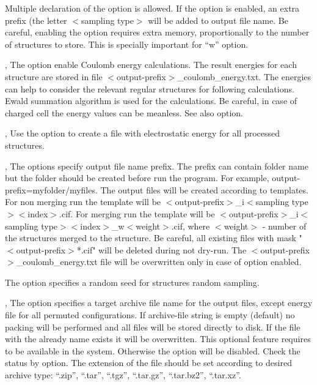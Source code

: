 \documentclass[a4paper,english]{article}
\begin{document}
\begin{Description}
      Multiple declaration of the option is allowed. If the option is enabled, an extra prefix (the letter $<$sampling type$>$ will be added to output file name. Be careful, enabling the option requires extra memory, proportionally to the number of structures to store. This is specially important for ``w'' option.

\item[\oOpt{-q}, \oOpt{\Dd coulomb-energy}] 
      The option enable Coulomb energy calculations. The result energies for each structure are stored in file $<$output-prefix$>$\_coulomb\_energy.txt. The energies can help to consider the relevant regular structures for following calculations. Ewald summation algorithm is used for the calculations. Be careful, in case of charged cell the energy values can be meanless. See also  option.

\item[\oOpt{-g}, \oOpt{\Dd coulomb-store}]
      Use the option to create a file with electrostatic energy for all processed structures.

\item[\oOptArg{-o }{output-prefix}, \oOptArg{\Dd output-prefix=}{output-prefix}]
      The options specify output file name prefix. The prefix can contain folder name but the folder should be created before run the program. For example, \Dd output-prefix=myfolder/myfiles. The output files will be created according to templates. For non merging run the template will be $<$output-prefix$>$\_i$<$sampling type$><$index$>$.cif. For merging run the template will be $<$output-prefix$>$\_i$<$sampling type$><$index$>$\_w$<$weight$>$.cif, where $<$weight$>$ - number of the structures merged to the structure. Be careful, all existing files with mask "$<$output-prefix$>$*.cif" will be deleted during not dry-run. The $<$output-prefix$>$\_coulomb\_energy.txt file will be overwritten only in case of  option enabled.
      
\item[\oOptArg{\Dd random-seed=}{number}]
      The option specifies a random seed for structures random sampling.
      
\item[\oOptArg{-a }{archive-file}, \oOptArg{\Dd archive=}{archive-file}]
      The option specifies a target archive file name for the output files, except energy file for all permuted configurations. If archive-file string is empty (default) no packing will be performed and all files will be stored directly to disk. If the file with the already name exists it will be overwritten. This optional feature requires   to be available in the system. Otherwise the option will be disabled. Check the status by  option. The extension of the file should be set according to desired archive type: ``.zip'', ``.tar'', ``.tgz'', ``.tar.gz'', ``.tar.bz2'', ``.tar.xz''.      

\end{Description}
\end{document}
